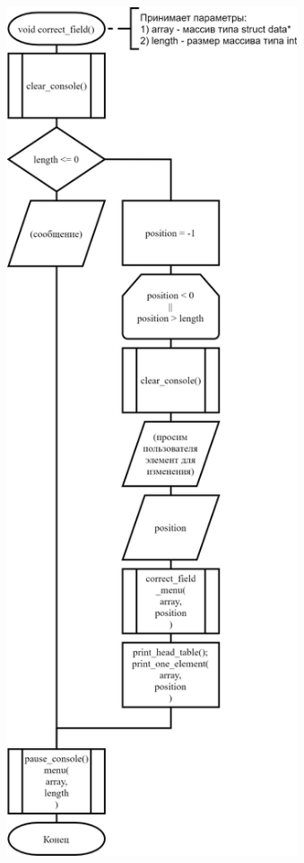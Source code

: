 \begin{figure}[!htp]
    \includegraphics[height=25cm]{../src/menu/correct_field/correct_field-1.png}
\end{figure}
